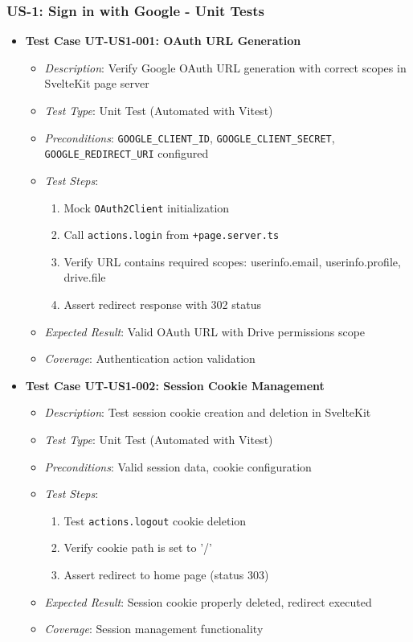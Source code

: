 \documentclass[12pt]{article}
\begin{document}
\subsubsection{US-1: Sign in with Google - Unit Tests}
\begin{itemize}
  \item \textbf{Test Case UT-US1-001: OAuth URL Generation}
    \begin{itemize}
      \item \textit{Description}: Verify Google OAuth URL generation with correct scopes in SvelteKit page server
      \item \textit{Test Type}: Unit Test (Automated with Vitest)
      \item \textit{Preconditions}: \texttt{GOOGLE\_CLIENT\_ID}, \texttt{GOOGLE\_CLIENT\_SECRET}, \texttt{GOOGLE\_REDIRECT\_URI} configured
      \item \textit{Test Steps}:
        \begin{enumerate}
          \item Mock \texttt{OAuth2Client} initialization
          \item Call \texttt{actions.login} from \texttt{+page.server.ts}
          \item Verify URL contains required scopes: userinfo.email, userinfo.profile, drive.file
          \item Assert redirect response with 302 status
        \end{enumerate}
      \item \textit{Expected Result}: Valid OAuth URL with Drive permissions scope
      \item \textit{Coverage}: Authentication action validation
    \end{itemize}

  \item \textbf{Test Case UT-US1-002: Session Cookie Management}
    \begin{itemize}
      \item \textit{Description}: Test session cookie creation and deletion in SvelteKit
      \item \textit{Test Type}: Unit Test (Automated with Vitest)
      \item \textit{Preconditions}: Valid session data, cookie configuration
      \item \textit{Test Steps}:
        \begin{enumerate}
          \item Test \texttt{actions.logout} cookie deletion
          \item Verify cookie path is set to '/'
          \item Assert redirect to home page (status 303)
        \end{enumerate}
      \item \textit{Expected Result}: Session cookie properly deleted, redirect executed
      \item \textit{Coverage}: Session management functionality
    \end{itemize}
\end{itemize}
\end{document}
